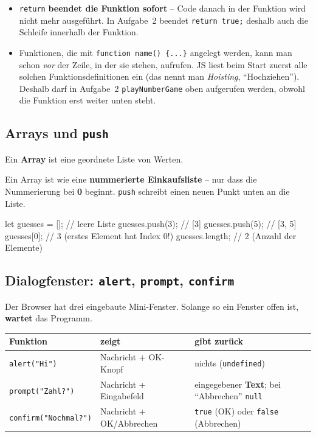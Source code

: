\documentclass[a4paper,11pt]{article}
\begin{document}
\begin{merkbox}
\begin{itemize}[nosep]
\item \lstinline|return| \textbf{beendet die Funktion sofort} -- Code danach in der Funktion wird nicht mehr ausgeführt.
      In Aufgabe~2 beendet \lstinline|return true;| deshalb auch die Schleife innerhalb der Funktion.
\item Funktionen, die mit \lstinline|function name() {...}| angelegt werden, kann man schon \emph{vor} der Zeile,
      in der sie stehen, aufrufen. JS liest beim Start zuerst alle solchen Funktionsdefinitionen ein
      (das nennt man \emph{Hoisting}, "`Hochziehen"'). Deshalb darf in Aufgabe~2 \texttt{playNumberGame} oben
      aufgerufen werden, obwohl die Funktion erst weiter unten steht.
\end{itemize}
\end{merkbox}

\subsection{Arrays und \texttt{push}}

Ein \textbf{Array} ist eine geordnete Liste von Werten.

\begin{analogie}
Ein Array ist wie eine \textbf{nummerierte Einkaufsliste} -- nur dass die Nummerierung bei \textbf{0} beginnt.
\lstinline|push| schreibt einen neuen Punkt unten an die Liste.
\end{analogie}

\begin{code}
let guesses = [];      // leere Liste
guesses.push(3);       // [3]
guesses.push(5);       // [3, 5]
guesses[0];            // 3   (erstes Element hat Index 0!)
guesses.length;        // 2   (Anzahl der Elemente)
\end{code}

\subsection{Dialogfenster: \texttt{alert}, \texttt{prompt}, \texttt{confirm}}

Der Browser hat drei eingebaute Mini-Fenster. Solange so ein Fenster offen ist, \textbf{wartet} das Programm.

\begin{center}
\begin{tabular}{@{}lp{3.6cm}p{5.6cm}@{}}
\toprule
Funktion & zeigt & gibt zurück\\
\midrule
\lstinline|alert("Hi")|   & Nachricht + OK-Knopf          & nichts (\texttt{undefined})\\
\lstinline|prompt("Zahl?")| & Nachricht + Eingabefeld     & eingegebener \textbf{Text}; bei "`Abbrechen"' \lstinline|null|\\
\lstinline|confirm("Nochmal?")| & Nachricht + OK/Abbrechen & \lstinline|true| (OK) oder \lstinline|false| (Abbrechen)\\
\bottomrule
\end{tabular}
\end{center}
\end{document}
